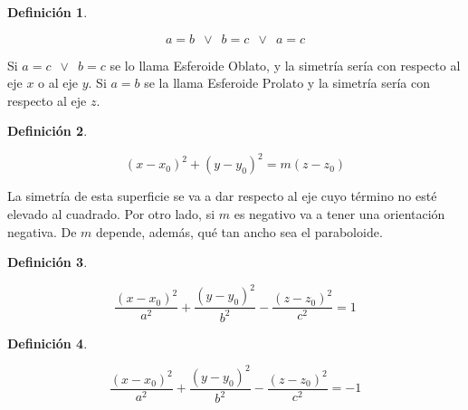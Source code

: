 \documentclass[a5paper,12pt,twoside]{book}
\newtheorem{defn}{{Definición}}[chapter]
\begin{document}
\begin{mdframed}[style=DefinitionFrame]
    \begin{defn}
    \end{defn}
    \begin{equation*}
        a=b \enspace \lor \enspace b=c \enspace \lor \enspace a=c
    \end{equation*}
\end{mdframed}

Si $a=c \enspace \lor \enspace b=c$ se lo llama Esferoide Oblato, y la simetría sería con respecto al eje $x$ o al eje $y$.
Si $a=b$ se la llama Esferoide Prolato y la simetría sería con respecto al eje $z$.

\begin{mdframed}[style=DefinitionFrame]
    \begin{defn}
    \end{defn}
    \begin{equation*}
        (x-x_0)^2 + (y-y_0)^2 = m(z-z_0)
    \end{equation*}
\end{mdframed}

La simetría de esta superficie se va a dar respecto al eje cuyo término no esté elevado al cuadrado.
Por otro lado, si $m$ es negativo va a tener una orientación negativa.
De $m$ depende, además, qué tan ancho sea el paraboloide.

\begin{mdframed}[style=DefinitionFrame]
    \begin{defn}
    \end{defn}
    \begin{equation*}
        \dfrac{(x-x_0)^2}{a^2} + \dfrac{(y-y_0)^2}{b^2} - \dfrac{(z-z_0)^2}{c^2} = 1
    \end{equation*}
\end{mdframed}

\begin{mdframed}[style=DefinitionFrame]
    \begin{defn}
    \end{defn}
    \begin{equation*}
        \dfrac{(x-x_0)^2}{a^2} + \dfrac{(y-y_0)^2}{b^2} - \dfrac{(z-z_0)^2}{c^2} = -1
    \end{equation*}
\end{mdframed}

\end{document}
